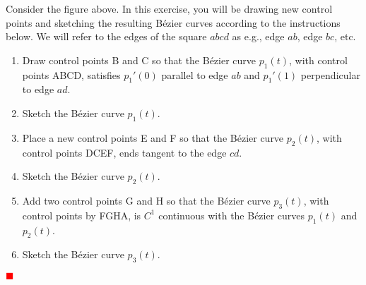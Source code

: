 \documentclass[12pt]{article}
\newcounter{problem}
\newcounter{problempart}[problem]
\newcounter{solutionpart}[problem]
\newenvironment{problem}{\stepcounter{problem}\noindent{\bf\arabic{problem}.}}{\setcounter{problempart}{0}\setcounter{solutionpart}{0}}
\newenvironment{solution}{\par\textcolor{blue}\bgroup}{\egroup\par}
\newcommand{\TODO}{\textcolor{red}{$\blacksquare$}}
\newcommand{\Bezier}{B\'ezier\xspace}
\begin{document}
\pagebreak
\begin{problem}
\begin{center}
\end{center}
Consider the figure above.  In this exercise, you will be drawing new control points and sketching the resulting \Bezier curves according to the instructions below.  We will refer to the edges of the square $abcd$ as e.g., edge $ab$, edge $bc$, etc.
\begin{enumerate}
\item Draw control points B and C so that the \Bezier curve $p_1(t)$, with control points ABCD, satisfies $p_1'(0)$ parallel to edge $ab$ and $p_1'(1)$ perpendicular to edge $ad$.
\item Sketch the \Bezier curve $p_1(t)$.
\item Place a new control points E and F so that the \Bezier curve $p_2(t)$, with control points DCEF, ends tangent to the edge $cd$.
\item Sketch the \Bezier curve $p_2(t)$.
\item Add two control points G and H so that the \Bezier curve $p_3(t)$, with control points by FGHA, is $C^1$ continuous with the \Bezier curves $p_1(t)$ and $p_2(t)$.
\item Sketch the \Bezier curve $p_3(t)$.
\end{enumerate}
\end{problem}

\begin{solution}
  \textbf{\textcolor{red}{\TODO}}
\end{solution}
\end{document}
